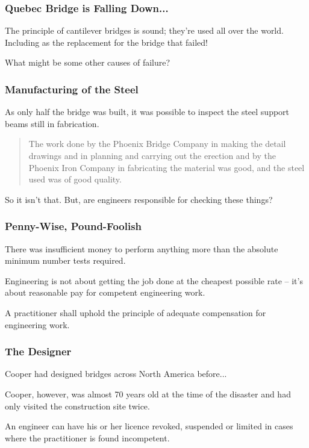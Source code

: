\begin{frame}
\frametitle{Quebec Bridge is Falling Down...}

The principle of cantilever bridges is sound; they're used all over the world.\\
\quad Including as the replacement for the bridge that failed!

What might be some other causes of failure?

\end{frame}



\begin{frame}
\frametitle{Manufacturing of the Steel}

As only half the bridge was built, it was possible to inspect the steel support beams still in fabrication.

\vspace{5em}

\begin{quote}
The work done by the Phoenix Bridge Company in making the detail drawings and in planning and carrying out the erection and by the Phoenix Iron Company in fabricating the material was good, and the steel used was of good quality.  
\end{quote}

So it isn't that. But, are engineers responsible for checking these things?

\end{frame}



\begin{frame}
\frametitle{Penny-Wise, Pound-Foolish}

There was insufficient money to perform anything more than the absolute minimum number tests required.


Engineering is not about getting the job done at the cheapest possible rate -- it's about reasonable pay for competent engineering work.


A practitioner shall uphold the principle of adequate compensation for engineering work.

\end{frame}



\begin{frame}
\frametitle{The Designer}

Cooper had designed bridges across North America before...

Cooper, however, was almost 70 years old at the time of the disaster and had only visited the construction site twice.

An engineer can have his or her licence revoked, suspended or limited in cases where the practitioner is found incompetent.

\end{frame}



